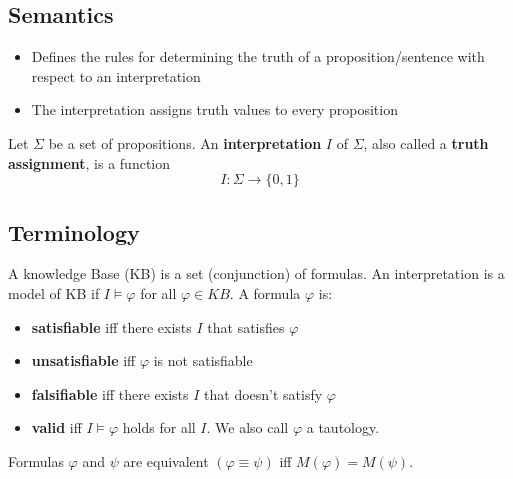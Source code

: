\documentclass[conference]{styles/acmsiggraph}
\begin{document}
    
    \subsection{Semantics}
        \begin{itemize}
            \item Defines the rules for determining the truth of a proposition/sentence with respect to an interpretation
            \item The interpretation assigns truth values to every proposition
        \end{itemize}
        
        Let $\Sigma$ be a set of propositions.
        An \textbf{interpretation} $I$ of $\Sigma$, also called a \textbf{truth assignment}, is a function
        $$I : \Sigma \rightarrow \{ 0,1 \}$$
    
    
    \subsection{Terminology}
        A knowledge Base (KB) is a set (conjunction) of formulas.\newline
        An interpretation is a model of KB if $I \vDash \varphi$ for all $\varphi \in KB$.\newline
        A formula $\varphi$ is:
            \begin{itemize}
                \item \textbf{satisfiable} iff there exists $I$ that satisfies $\varphi$
                \item \textbf{unsatisfiable} iff $\varphi$ is not satisfiable
                \item \textbf{falsifiable} iff there exists $I$ that doesn't satisfy $\varphi$
                \item \textbf{valid} iff $I \vDash \varphi$ holds for all $I$. We also call $\varphi$ a tautology.
            \end{itemize}
        
        Formulas $\varphi$ and $\psi$ are equivalent $(\varphi \equiv \psi)$ iff $M(\varphi) = M(\psi)$.
    
    
\end{document}
